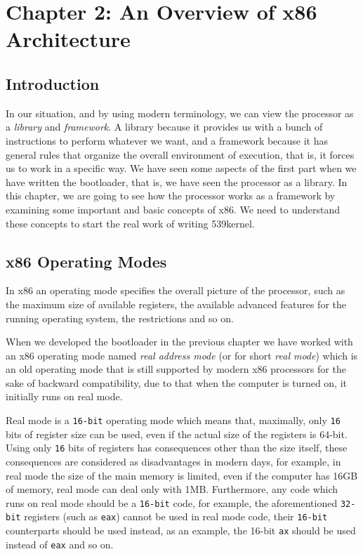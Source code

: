 \chapter{Chapter 2: An Overview of x86 Architecture}\label{ch-x86}

\section{Introduction}\label{introduction}

In our situation, and by using modern terminology, we can view the
processor as a \emph{library} and \emph{framework}. A library because it
provides us with a bunch of instructions to perform whatever we want,
and a framework because it has general rules that organize the overall
environment of execution, that is, it forces us to work in a specific
way. We have seen some aspects of the first part when we have written
the bootloader, that is, we have seen the processor as a library. In
this chapter, we are going to see how the processor works as a framework
by examining some important and basic concepts of x86. We need to
understand these concepts to start the real work of writing 539kernel.

\section{x86 Operating Modes}\label{x86-operating-modes}

In x86 an operating mode specifies the overall picture of the processor,
such as the maximum size of available registers, the available advanced
features for the running operating system, the restrictions and so on.

When we developed the bootloader in the previous chapter we have worked
with an x86 operating mode named \emph{real address mode} (or for short
\emph{real mode}) which is an old operating mode that is still supported
by modern x86 processors for the sake of backward compatibility, due to
that when the computer is turned on, it initially runs on real mode.

Real mode is a \lstinline!16-bit! operating mode which means that,
maximally, only \lstinline!16! bits of register size can be used, even
if the actual size of the registers is 64-bit. Using only \lstinline!16!
bits of registers has consequences other than the size itself, these
consequences are considered as disadvantages in modern days, for
example, in real mode the size of the main memory is limited, even if
the computer has 16GB of memory, real mode can deal only with 1MB.
Furthermore, any code which runs on real mode should be a
\lstinline!16-bit! code, for example, the aforementioned
\lstinline!32-bit! registers (such as \lstinline!eax!) cannot be used in
real mode code, their \lstinline!16-bit! counterparts should be used
instead, as an example, the 16-bit \lstinline!ax! should be used instead
of \lstinline!eax! and so on.

